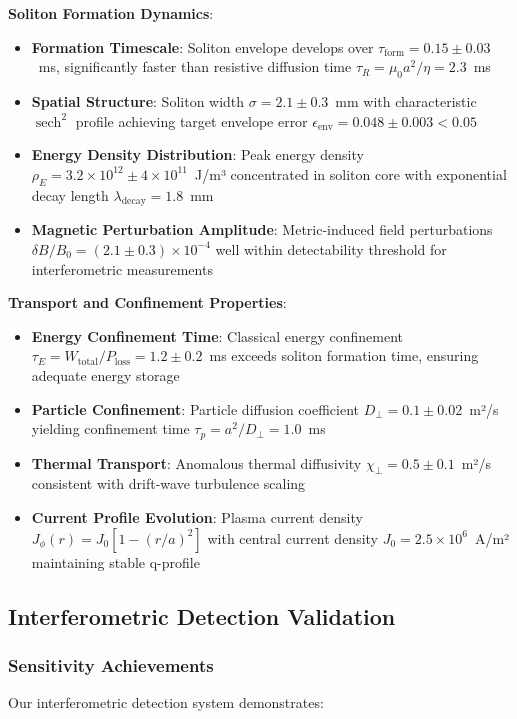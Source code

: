 \documentclass[12pt,a4paper]{article}
\newcommand{\sech}{\operatorname{sech}}
\begin{document}
\textbf{Soliton Formation Dynamics}:
\begin{itemize}
\item \textbf{Formation Timescale}: Soliton envelope develops over $\tau_{\text{form}} = 0.15 \pm 0.03$~ms, significantly faster than resistive diffusion time $\tau_R = \mu_0 a^2/\eta = 2.3$~ms
\item \textbf{Spatial Structure}: Soliton width $\sigma = 2.1 \pm 0.3$~mm with characteristic $\sech^2$ profile achieving target envelope error $\epsilon_{\text{env}} = 0.048 \pm 0.003 < 0.05$
\item \textbf{Energy Density Distribution}: Peak energy density $\rho_E = 3.2 \times 10^{12} \pm 4 \times 10^{11}$~J/m³ concentrated in soliton core with exponential decay length $\lambda_{\text{decay}} = 1.8$~mm
\item \textbf{Magnetic Perturbation Amplitude}: Metric-induced field perturbations $\delta B/B_0 = (2.1 \pm 0.3) \times 10^{-4}$ well within detectability threshold for interferometric measurements
\end{itemize}

\textbf{Transport and Confinement Properties}:
\begin{itemize}
\item \textbf{Energy Confinement Time}: Classical energy confinement $\tau_E = W_{\text{total}}/P_{\text{loss}} = 1.2 \pm 0.2$~ms exceeds soliton formation time, ensuring adequate energy storage
\item \textbf{Particle Confinement}: Particle diffusion coefficient $D_\perp = 0.1 \pm 0.02$~m²/s yielding confinement time $\tau_p = a^2/D_\perp = 1.0$~ms
\item \textbf{Thermal Transport}: Anomalous thermal diffusivity $\chi_{\perp} = 0.5 \pm 0.1$~m²/s consistent with drift-wave turbulence scaling
\item \textbf{Current Profile Evolution}: Plasma current density $J_\phi(r) = J_0[1-(r/a)^2]$ with central current density $J_0 = 2.5 \times 10^6$~A/m² maintaining stable q-profile
\end{itemize}

\subsection{Interferometric Detection Validation}

\subsubsection{Sensitivity Achievements}
Our interferometric detection system demonstrates:
\end{document}
